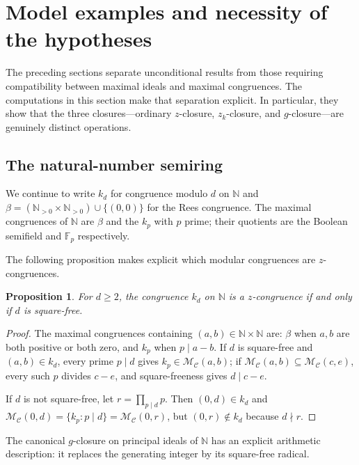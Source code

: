 \documentclass[11pt,leqno]{amsart}
\theoremstyle{plain}
\newtheorem{proposition}[theorem]{Proposition}
\theoremstyle{definition}
\theoremstyle{remark}
\numberwithin{equation}{section}
\newcommand{\MC}{\mathcal M_{\mathcal C}}
\newcommand{\N}{\mathds N}
\begin{document}
\section{Model examples and necessity of the
hypotheses}\label{sec:examples}

The preceding sections separate unconditional results from those
requiring compatibility between maximal ideals and maximal congruences.
The computations in this section make that separation explicit.
In particular, they show that the three closures---ordinary $z$-closure,
$z_k$-closure, and $g$-closure---are genuinely distinct operations.

\subsection{The natural-number semiring}

We continue to write $k_d$ for congruence modulo $d$ on $\N$
and $\beta=(\N_{>0}\times\N_{>0})\cup\{(0,0)\}$
for the Rees congruence.
The maximal congruences of $\N$ are $\beta$ and the $k_p$ with $p$
prime; their quotients are the Boolean semifield and $\mathds F_p$
respectively.

The following proposition makes explicit which modular congruences
are $z$-congruences.

\begin{proposition}\label{prop:N-zcong-squarefree}
For $d\geqslant2$, the congruence $k_d$ on $\N$ is a $z$-congruence
if and only if $d$ is square-free.
\end{proposition}
\begin{proof}
The maximal congruences containing $(a,b)\in\N\times\N$ are:
$\beta$ when $a,b$ are both positive or both zero,
and $k_p$ when $p\mid a-b$.
If $d$ is square-free and $(a,b)\in k_d$, every prime $p\mid d$
gives $k_p\in\MC(a,b)$;
if $\MC(a,b)\subseteq\MC(c,e)$, every such $p$ divides $c-e$,
and square-freeness gives $d\mid c-e$.

If $d$ is not square-free, let $r=\prod_{p\mid d}p$.
Then $(0,d)\in k_d$ and
$\MC(0,d)=\{k_p:p\mid d\}=\MC(0,r)$,
but $(0,r)\notin k_d$ because $d\nmid r$.
\end{proof}

The canonical $g$-closure on principal ideals of $\N$ has an
explicit arithmetic description: it replaces the generating integer
by its square-free radical.
\end{document}

